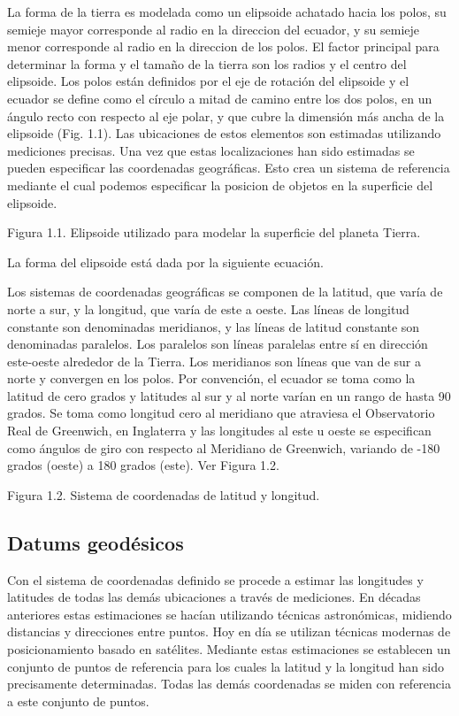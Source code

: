La forma de la tierra es modelada como un elipsoide achatado hacia los polos, su semieje mayor corresponde al radio en la direccion del ecuador, y su semieje menor corresponde al radio en la direccion de los polos. El factor principal para determinar la forma y el tamaño de la tierra son los  radios y el centro del elipsoide. Los polos están definidos por el eje de rotación del elipsoide y el ecuador se define como el círculo a mitad de camino entre los dos polos, en un ángulo recto con respecto al eje polar, y que cubre la dimensión más ancha de la elipsoide (Fig. 1.1). Las ubicaciones de estos elementos son estimadas utilizando mediciones  precisas. Una vez que estas localizaciones han sido estimadas se pueden especificar las coordenadas geográficas. Esto crea un sistema de referencia mediante el cual podemos especificar la posicion de objetos en la superficie del elipsoide.

Figura 1.1. Elipsoide utilizado para modelar la superficie del planeta Tierra.

La forma del elipsoide está dada por la siguiente ecuación.

Los sistemas de coordenadas geográficas se componen de la latitud, que varía de norte a sur, y la longitud, que varía de este a oeste. Las líneas de longitud constante son denominadas meridianos, y las líneas de latitud constante son denominadas paralelos. Los paralelos son líneas paralelas entre sí en dirección este-oeste alrededor de la Tierra. Los meridianos son líneas que van de sur a norte y convergen en los polos. Por convención, el ecuador se toma como la latitud de cero grados y latitudes al sur y al norte varían en un rango de hasta 90 grados. Se toma como longitud cero al meridiano que atraviesa el Observatorio Real de Greenwich, en Inglaterra y las longitudes al este u oeste se especifican como ángulos de giro con respecto al Meridiano de Greenwich, variando de -180 grados (oeste) a 180 grados (este). Ver Figura 1.2.

Figura 1.2. Sistema de coordenadas de latitud y longitud.

\subsection{Datums geodésicos}

Con el sistema de coordenadas definido se procede a estimar las longitudes y latitudes de todas las demás ubicaciones a través de mediciones. En décadas anteriores estas estimaciones se hacían utilizando técnicas astronómicas, midiendo distancias y direcciones entre puntos. Hoy en día se utilizan técnicas modernas de posicionamiento basado en satélites. Mediante estas estimaciones se establecen un conjunto de puntos de referencia para los cuales la latitud y la longitud han sido precisamente determinadas. Todas las demás coordenadas se miden con referencia a este conjunto de puntos.

